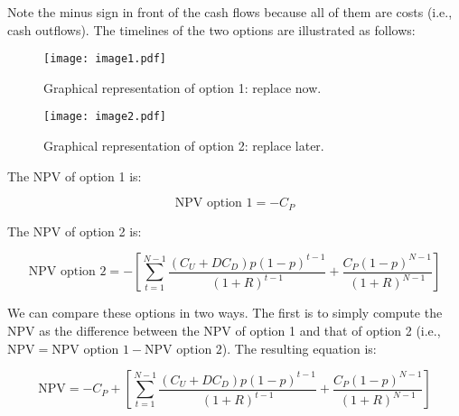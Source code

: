 Note the minus sign in front of the cash flows because all of them are costs
(i.e., cash outflows). The timelines of the two options are illustrated as follows: \par




\begin{figure}
    \centering
    \centerline{\texttt{[image: image1.pdf]}}
    \caption{Graphical representation of option 1: replace now.}
    \label{fig:_Graphical_representation_of_option_1_replace_now}
\end{figure}




\begin{figure}
    \centering
    \centerline{\texttt{[image: image2.pdf]}}
    \caption{Graphical representation of option 2: replace later.}
    \label{fig:_Graphical_representation_of_option_1_replace_later}
\end{figure}



The NPV of option 1 is: \par

\begin{equation}\label{npv_6}
\mbox{NPV option 1}= -C_{P}
\end{equation}

The NPV of option 2 is:\par

\begin{equation}\label{npv_7}
\mbox{NPV option }2= - \left[  \sum _{t=1}^{N-1}\frac{ \left( C_{U}+DC_{D} \right) p \left( 1-p \right) ^{t-1}}{ \left( 1+R \right) ^{t-1}}+\frac{C_{P} \left( 1-p \right) ^{N-1}}{ \left( 1+R \right) ^{N-1}} \right]
\end{equation}


We can compare these options in two ways. The first is to simply compute the
NPV as the difference between the NPV of option 1 and that of option 2 (i.e.,
\( \mbox{NPV}=\mbox{NPV option }1-\mbox{NPV option }2 \)). The resulting equation is:\par

\begin{equation}\label{npv_7}
\mbox{NPV}= -C_{P}+ \left[  \sum _{t=1}^{N-1}\frac{ \left( C_{U}+DC_{D} \right) p \left( 1-p \right) ^{t-1}}{ \left( 1+R \right) ^{t-1}}+\frac{C_{P} \left( 1-p \right) ^{N-1}}{ \left( 1+R \right) ^{N-1}} \right]
\end{equation}


